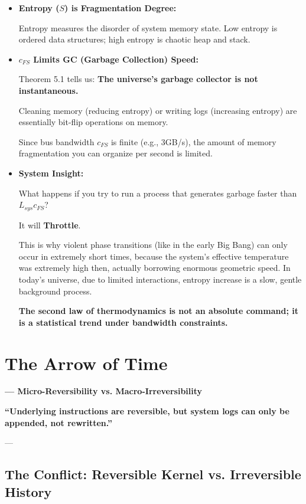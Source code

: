 \documentclass[11pt,a4paper,twoside]{book}
\begin{document}
\begin{itemize}
\item \textbf{Entropy ($S$) is Fragmentation Degree:}

    Entropy measures the disorder of system memory state. Low entropy is ordered data structures; high entropy is chaotic heap and stack.

\item \textbf{$c_{FS}$ Limits GC (Garbage Collection) Speed:}

    Theorem 5.1 tells us: \textbf{The universe's garbage collector is not instantaneous.}

    Cleaning memory (reducing entropy) or writing logs (increasing entropy) are essentially bit-flip operations on memory.

    Since bus bandwidth \textbf{$c_{FS}$} is finite (e.g., 3GB/s), the amount of memory fragmentation you can organize per second is limited.

\item \textbf{System Insight:}

    What happens if you try to run a process that generates garbage faster than \textbf{$L_{sys} c_{FS}$}?

    It will \textbf{Throttle}.

    This is why violent phase transitions (like in the early Big Bang) can only occur in extremely short times, because the system's effective temperature was extremely high then, actually borrowing enormous geometric speed. In today's universe, due to limited interactions, entropy increase is a slow, gentle background process.

    \textbf{The second law of thermodynamics is not an absolute command; it is a statistical trend under bandwidth constraints.}
\end{itemize}

 \section{The Arrow of Time}

\textbf{--- Micro-Reversibility vs. Macro-Irreversibility}

\textbf{``Underlying instructions are reversible, but system logs can only be appended, not rewritten.''}

---

\subsection{The Conflict: Reversible Kernel vs. Irreversible History}
\end{document}

